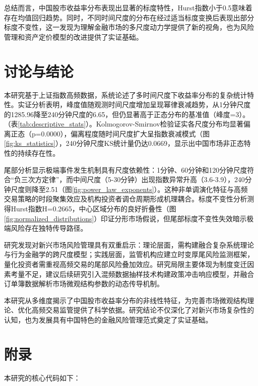 \documentclass[12pt, a4paper]{article}
\begin{document}
总结而言，中国股市收益率分布表现出显著的标度特性，Hurst指数小于0.5意味着存在均值回归趋势。同时，不同时间尺度的分布在经过适当标度变换后表现出部分标度不变性，这一发现为理解金融市场的多尺度动力学提供了新的视角，也为风险管理和资产定价模型的改进提供了实证基础。

\section{讨论与结论}

本研究基于上证指数高频数据，系统论述了多时间尺度下收益率分布的复杂统计特性。实证分析表明，峰度值随观测时间尺度增加呈现幂律衰减趋势，从1分钟尺度的1285.96降至240分钟尺度的6.65，但仍显著高于正态分布的基准值（峰度=3）。（表\ref{tab:descriptive_stats}）。Kolmogorov-Smirnov检验证实各尺度分布均显著偏离正态（p=0.0000），偏离程度随时间尺度扩大呈指数衰减模式（图\ref{fig:ks_statistics}），240分钟尺度KS统计量仍达0.0669，显示出中国市场非正态特性的持续存在性。

尾部分析显示极端事件发生机制具有尺度依赖性：1分钟、60分钟和120分钟尺度符合“负三次方定律”，而中间尺度（5-30分钟）出现指数异常升高（3.6-3.9），240分钟尺度则降至2.51（图\ref{fig:power_law_exponents}）。这种非单调演化特征与高频交易策略的时段聚集效应及机构投资者调仓周期形成机理耦合。标度不变性分析测得Hurst指数H=0.2665，中心区域分布的良好折叠性（图\ref{fig:normalized_distributions}）印证分形市场假说，但尾部标度不变性失效暗示极端风险存在独特传导路径。

研究发现对新兴市场风险管理具有双重启示：理论层面，需构建融合复杂系统理论与行为金融学的跨尺度模型；实践层面，监管机构应建立时变厚尾风险监测框架，量化投资者需重视高频交易的尾部风险叠加效应。研究局限主要体现为制度变迁因素考量不足，建议后续研究引入混频数据抽样技术构建政策冲击响应模型，并融合订单簿数据解析市场微观结构参数的动态传导机制。

本研究从多维度揭示了中国股市收益率分布的非线性特征，为完善市场微观结构理论、优化高频交易监管提供了科学依据。研究结论不仅深化了对新兴市场复杂性的认知，也为发展具有中国特色的金融风险管理范式奠定了实证基础。

\printbibliography[title=参考文献]

\section{附录}

本研究的核心代码如下：
\end{document}
